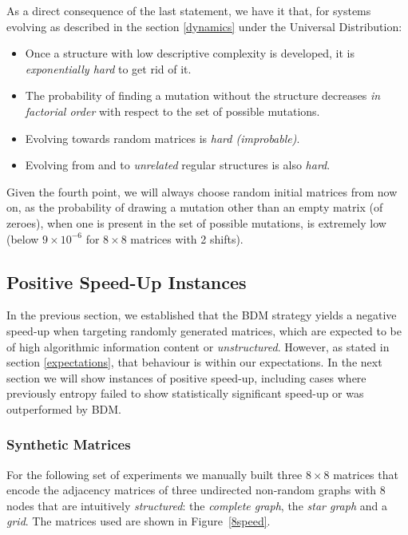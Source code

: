 \documentclass[10pt]{article}
\begin{document}
\begin{prop}\label{prop1}
As a direct consequence of the last statement, we have it that, for systems evolving as described in the section \ref{dynamics} under the Universal Distribution:

\begin{itemize}
    \item
    Once a structure with low descriptive complexity is developed, it is
    \emph{exponentially hard} to get rid of it.
    \item The probability of finding a mutation without the structure decreases \emph{in factorial order} with respect to the set of possible mutations.
    \item
    Evolving towards random matrices is \emph{hard (improbable)}.
    \item
    Evolving from and to \emph{unrelated} regular structures is also \emph{hard}.
\end{itemize}
\end{prop}

\noindent{}Given the fourth point, we will always choose
 random initial matrices from now on, as the probability of drawing a mutation other than an empty matrix (of zeroes), when one is
  present in the set of possible mutations, is extremely low (below $9 \times 10^{-6}$ for $8 \times 8$ matrices with 2 shifts).

\subsection{Positive Speed-Up Instances}

In the previous section, we established that the BDM strategy yields a negative speed-up when targeting randomly generated matrices, which are expected to be of high algorithmic information content or \textit{unstructured}. However, as stated in section \ref{expectations}, that behaviour is within our expectations. In the next section we will show instances of positive speed-up, including cases where previously entropy failed to show statistically significant speed-up or was outperformed by BDM.

\subsubsection{Synthetic Matrices}

For the following set of experiments we manually built three
\(8 \times 8\) matrices that encode the adjacency matrices of three
undirected non-random graphs with 8 nodes that are intuitively
\emph{structured}: the \textit{complete graph}, the \textit{star graph}
and a \textit{grid}. The matrices used are shown in Figure~\ref{8speed}.
\end{document}
